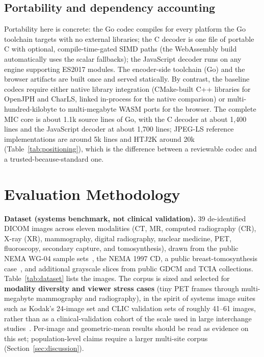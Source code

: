 \documentclass[journal]{IEEEtran}
\begin{document}
\subsection{Portability and dependency accounting}

Portability here is concrete: the Go codec compiles for every platform the Go
toolchain targets with no external libraries; the C decoder is one file of
portable C with optional, compile-time-gated SIMD paths (the WebAssembly
build automatically uses the scalar fallbacks); the JavaScript decoder runs
on any engine supporting ES2017 modules. The encoder-side toolchain (Go) and
the browser artifacts are built once and served statically. By contrast, the
baseline codecs require either native library integration (CMake-built C++
libraries for OpenJPH and CharLS, linked in-process for the native
comparison) or multi-hundred-kilobyte to multi-megabyte WASM ports for the
browser. The complete MIC core is about 1.1k source lines of Go, with the C
decoder at about 1,400 lines and the JavaScript decoder at about 1,700
lines; JPEG-LS reference implementations are around 5k lines and HTJ2K
around 20k (Table~\ref{tab:positioning}), which is the difference between a
reviewable codec and a trusted-because-standard one.

\section{Evaluation Methodology}
\label{sec:methodology}

\textbf{Dataset (systems benchmark, not clinical validation).}
39 de-identified DICOM images across eleven modalities (CT, MR, computed
radiography (CR), X-ray (XR), mammography, digital radiography, nuclear
medicine, PET, fluoroscopy, secondary capture, and tomosynthesis), drawn from
the public NEMA WG-04 sample sets~\cite{nema_wg04}, the NEMA 1997 CD, a
public breast-tomosynthesis case~\cite{clunie_tomo}, and additional grayscale
slices from public GDCM and TCIA collections. Table~\ref{tab:dataset} lists
the images. The corpus is sized and selected for \textbf{modality diversity
and viewer stress cases} (tiny PET frames through multi-megabyte mammography
and radiography), in the spirit of systems image suites such as Kodak's
24-image set and CLIC validation sets of roughly 41--61 images, rather than
as a clinical-validation cohort of the scale used in large interchange
studies~\cite{clunie2000}. Per-image and geometric-mean results should be
read as evidence on this set; population-level claims require a larger
multi-site corpus (Section~\ref{sec:discussion}).
\end{document}
